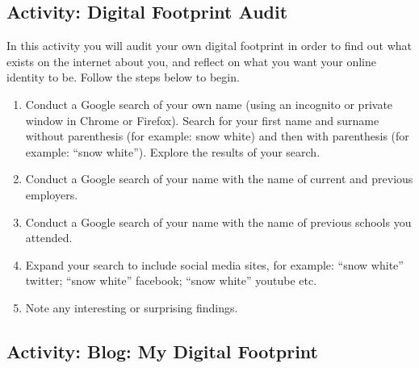 \documentclass[
]{book}
\providecommand{\tightlist}{%
  \setlength{\itemsep}{0pt}\setlength{\parskip}{0pt}}
\theoremstyle{definition}
\theoremstyle{definition}
\theoremstyle{definition}
\theoremstyle{definition}
\theoremstyle{remark}
\begin{document}
\hypertarget{activity-digital-footprint-audit}{%
\subsection*{Activity: Digital Footprint Audit}\label{activity-digital-footprint-audit}}

\begin{reflect}
In this activity you will audit your own digital footprint in order to find out what exists on the internet about you, and reflect on what you want your online identity to be. Follow the steps below to begin.

\begin{enumerate}
\def\labelenumi{\arabic{enumi}.}
\tightlist
\item
  Conduct a Google search of your own name (using an incognito or private window in Chrome or Firefox). Search for your first name and surname without parenthesis (for example: snow white) and then with parenthesis (for example: ``snow white''). Explore the results of your search.
\item
  Conduct a Google search of your name with the name of current and previous employers.
\item
  Conduct a Google search of your name with the name of previous schools you attended.
\item
  Expand your search to include social media sites, for example: ``snow white'' twitter; ``snow white'' facebook; ``snow white'' youtube etc.
\item
  Note any interesting or surprising findings.
\end{enumerate}
\end{reflect}

\hypertarget{activity-blog-my-digital-footprint}{%
\subsection*{Activity: Blog: My Digital Footprint}\label{activity-blog-my-digital-footprint}}
\end{document}
